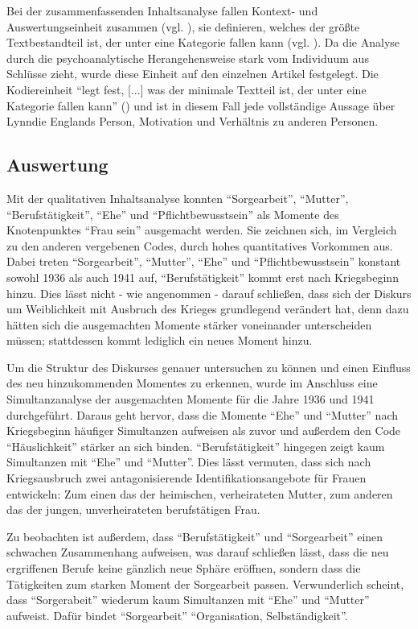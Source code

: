 \documentclass[12pt, titlepage=true, toc=bib]{scrartcl}
\begin{document}
Bei der zusammenfassenden Inhaltsanalyse fallen Kontext- und Auswertungseinheit zusammen (vgl. \cite[71]{mayring_qualitative_2010}), sie definieren, welches der größte Textbestandteil ist, der unter eine Kategorie fallen kann (vgl. \cite[59]{mayring_qualitative_2010}). Da die Analyse durch die psychoanalytische Herangehensweise stark vom Individuum aus Schlüsse zieht, wurde diese Einheit auf den einzelnen Artikel festgelegt. Die Kodiereinheit "`legt fest, [...] was der minimale Textteil ist, der unter eine Kategorie fallen kann"' (\cite[59]{mayring_qualitative_2010}) und ist in diesem Fall jede vollständige Aussage über Lynndie Englands Person, Motivation und Verhältnis zu anderen Personen.

\subsection{Auswertung}

Mit der qualitativen Inhaltsanalyse konnten "`Sorgearbeit"', "`Mutter"', "`Berufstätigkeit"', "`Ehe"' und "`Pflichtbewusstsein"' als Momente des Knotenpunktes "`Frau sein"' ausgemacht werden. Sie zeichnen sich, im Vergleich zu den anderen vergebenen Codes, durch hohes quantitatives Vorkommen aus. Dabei treten "`Sorgearbeit"', "`Mutter"', "`Ehe"' und "`Pflichtbewusstsein"' konstant sowohl 1936 als auch 1941 auf, "`Berufstätigkeit"' kommt erst nach Kriegsbeginn hinzu. Dies lässt nicht - wie angenommen - darauf schließen, dass sich der Diskurs um Weiblichkeit mit Ausbruch des Krieges grundlegend verändert hat, denn dazu hätten sich die ausgemachten Momente stärker voneinander unterscheiden müssen; stattdessen kommt lediglich ein neues Moment hinzu.

Um die Struktur des Diskurses genauer untersuchen zu können und einen Einfluss des neu hinzukommenden Momentes zu erkennen, wurde im Anschluss eine Simultanzanalyse der ausgemachten Momente für die Jahre 1936 und 1941 durchgeführt. Daraus geht hervor, dass die Momente "`Ehe"' und "`Mutter"' nach Kriegsbeginn häufiger Simultanzen aufweisen als zuvor und außerdem den Code "`Häuslichkeit"' stärker an sich binden. "`Berufstätigkeit"' hingegen zeigt kaum Simultanzen mit "`Ehe"' und "`Mutter"'. Dies lässt vermuten, dass sich nach Kriegsausbruch zwei antagonisierende Identifikationsangebote für Frauen entwickeln: Zum einen das der heimischen, verheirateten Mutter, zum anderen das der jungen, unverheirateten berufstätigen Frau. 

Zu beobachten ist außerdem, dass "`Berufstätigkeit"' und "`Sorgearbeit"' einen schwachen Zusammenhang aufweisen, was darauf schließen lässt, dass die neu ergriffenen Berufe keine gänzlich neue Sphäre eröffnen, sondern dass die Tätigkeiten zum starken Moment der Sorgearbeit passen. Verwunderlich scheint, dass "`Sorgerabeit"' wiederum kaum Simultanzen mit "`Ehe"' und "`Mutter"' aufweist. Dafür bindet "`Sorgearbeit"' "`Organisation, Selbständigkeit"'.
\end{document}
